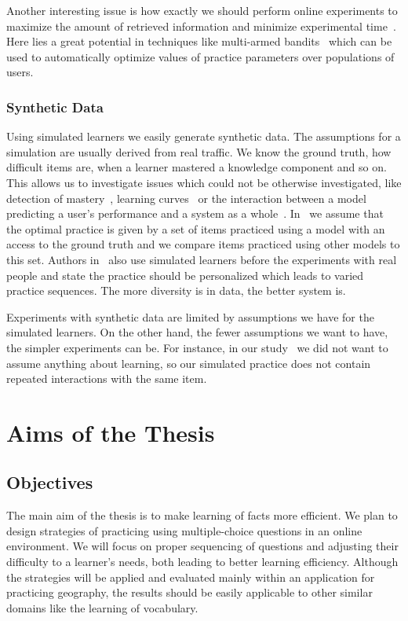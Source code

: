 \documentclass[table,color,cover,twoside,nolot,nolof]{fithesis3/fithesis3}
\begin{document}
Another interesting issue is how exactly we should perform online
experiments to maximize the amount of retrieved information and minimize
experimental time~\cite{liu2014towards}. Here lies a great potential in techniques
like multi-armed bandits~\cite{liu2014trading} which can be used to
automatically optimize values of practice parameters over populations of users.

\subsection{Synthetic Data}

Using simulated learners we easily generate synthetic data. The assumptions for
a simulation are usually derived from real traffic. We know the ground truth, how
difficult items are, when a learner mastered a knowledge component and so on.
This allows us to investigate issues which could not be otherwise investigated, like
detection of mastery~\cite{fancsali2013optimal}, learning
curves~\cite{fancsali2013simulated} or the interaction between a model
predicting a user's performance and a system as a
whole~\cite{niznan2015exploring}. In~\cite{niznan2015exploring} we assume that
the optimal practice is given by a set of items practiced using a model with an
access to the ground truth and we compare items practiced using other models to
this set. Authors in~\cite{lopes2015multi} also use simulated learners before
the experiments with real people and state the practice should be personalized
which leads to varied practice sequences. The more diversity is in data, the better
system is.

Experiments with synthetic data are limited by assumptions we have for the
simulated learners. On the other hand, the fewer assumptions we want to have,
the simpler experiments can be. For instance, in our
study~\cite{niznan2015exploring} we did not want to assume anything about
learning, so our simulated practice does not contain repeated interactions with
the same item.

\chapter{Aims of the Thesis}
\label{chapter:aims_of_the_thesis}

\section{Objectives}

The main aim of the thesis is to make learning of facts more
efficient. We plan to design strategies of practicing using multiple-choice
questions in an online environment. We will focus on proper sequencing of
questions and adjusting their difficulty to a learner's needs, both leading to
better learning efficiency. Although the strategies will be applied and
evaluated mainly within an application for practicing geography, the results
should be easily applicable to other similar domains like the learning of
vocabulary.
\end{document}
